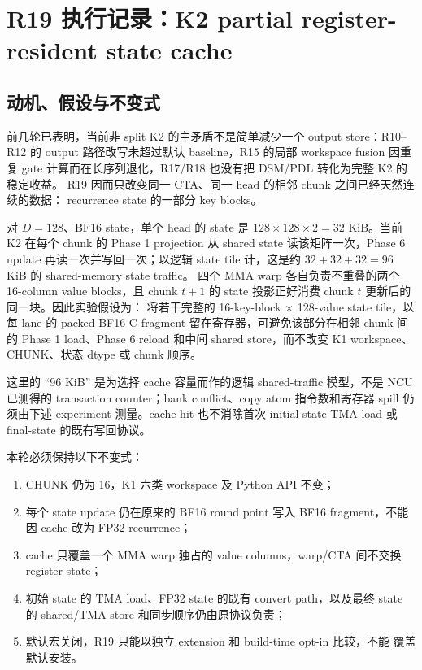 \section{R19 执行记录：K2 partial register-resident state cache}

\subsection{动机、假设与不变式}

前几轮已表明，当前非 split K2 的主矛盾不是简单减少一个 output store：R10--R12
的 output 路径改写未超过默认 baseline，R15 的局部 workspace fusion 因重复
gate 计算而在长序列退化，R17/R18 也没有把 DSM/PDL 转化为完整 K2 的稳定收益。
R19 因而只改变同一 CTA、同一 head 的相邻 chunk 之间已经天然连续的数据：
recurrence state 的一部分 key blocks。

对 \(D=128\)、BF16 state，单个 head 的 state 是
\(128\times128\times2=32\) KiB。当前 K2 在每个 chunk 的 Phase 1 projection
从 shared state 读该矩阵一次，Phase 6 update 再读一次并写回一次；以逻辑
state tile 计，这是约 \(32+32+32=96\) KiB 的 shared-memory state traffic。
四个 MMA warp 各自负责不重叠的两个 16-column value blocks，且 chunk
\(t+1\) 的 state 投影正好消费 chunk \(t\) 更新后的同一块。因此实验假设为：
将若干完整的 16-key-block \(\times\) 128-value state tile，以每 lane 的
packed BF16 C fragment 留在寄存器，可避免该部分在相邻 chunk 间的 Phase 1
load、Phase 6 reload 和中间 shared store，而不改变 K1 workspace、CHUNK、状态
dtype 或 chunk 顺序。

这里的 ``96 KiB'' 是为选择 cache 容量而作的逻辑 shared-traffic 模型，不是
NCU 已测得的 transaction counter；bank conflict、copy atom 指令数和寄存器
spill 仍须由下述 experiment 测量。cache hit 也不消除首次 initial-state TMA
load 或 final-state 的既有写回协议。

本轮必须保持以下不变式：

\begin{enumerate}
  \item CHUNK 仍为 16，K1 六类 workspace 及 Python API 不变；
  \item 每个 state update 仍在原来的 BF16 round point 写入 BF16 fragment，不能
        因 cache 改为 FP32 recurrence；
  \item cache 只覆盖一个 MMA warp 独占的 value columns，warp/CTA 间不交换
        register state；
  \item 初始 state 的 TMA load、FP32 state 的既有 convert path，以及最终 state
        的 shared/TMA store 和同步顺序仍由原协议负责；
  \item 默认宏关闭，R19 只能以独立 extension 和 build-time opt-in 比较，不能
        覆盖默认安装。
\end{enumerate}

